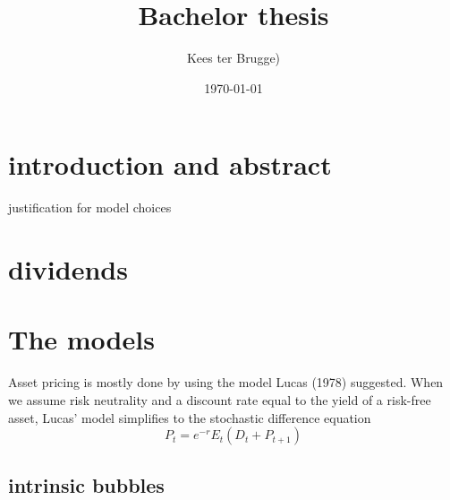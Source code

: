 \documentclass{article}
\title{Bachelor thesis}
\author{Kees ter Brugge)\\}
\date{\today}
\makeatletter
\def\maketitle{%
  \null
  \thispagestyle{empty}%
  \vfill
  \begin{center}\leavevmode
    \normalfont
    {\LARGE \@title\par}%
    \vskip 1cm
    {\Large \@author\par}%
    \vskip 1cm
    {\Large \@date\par}%
  \end{center}%
  \vfill
  \null
  \cleardoublepage
  }
\makeatother
\begin{document}
 \maketitle



\newpage
\section{introduction and abstract}


justification for model choices

\section{dividends}

\section{The models}

Asset pricing is mostly done by using the model Lucas (1978) suggested. When we assume risk neutrality and a discount rate equal to the yield of a risk-free asset, Lucas' model simplifies to the stochastic difference equation
$$P_t = e^{-r}E_t(D_t + P_{t+1}) \label{standard} $$


\subsection{intrinsic bubbles}
\end{document}
